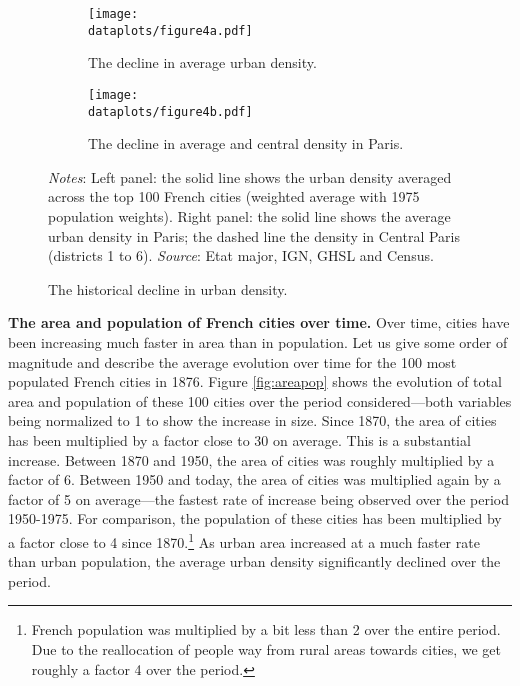 \documentclass[./20250130-paper.tex]{subfiles}
\begin{document}
\begin{figure}[p]
	\begin{subfigure}{0.5\textwidth}
		\texttt{[image: \\dataplots/figure4a.pdf]}
		\caption{The decline in average urban density.\label{fig:avdensity}
		}
	\end{subfigure}%
	\hspace{5mm}
	\begin{subfigure}{0.5\textwidth}
		\texttt{[image: \\dataplots/figure4b.pdf]}
		\caption{The decline in average and central density in Paris.\label{fig:avdensity-paris}}
	\end{subfigure}
	\caption{The historical decline in urban density.}
	{\footnotesize \textit{Notes}: Left panel: the solid line shows the urban density averaged across the top 100 French cities (weighted average with 1975 population weights). Right panel: the solid line shows the average urban density in Paris; the dashed line the density in Central Paris (districts 1 to 6).
		\textit{Source}: Etat major, IGN, GHSL and Census.}
\end{figure}


\textbf{The area and population of French cities over time.} Over time, cities have been increasing much faster in area than in population. Let us give some order of magnitude and describe the average evolution over time for the 100 most populated French cities in 1876. Figure \ref{fig:areapop} shows the evolution of total area and population of these 100 cities over the period considered---both variables being normalized to 1 to show the increase in size. Since 1870, the area of cities has been multiplied by a factor close to 30 on average. This is a substantial increase. Between 1870 and 1950,  the area of cities was roughly multiplied by a factor of 6. Between 1950 and today, the area of cities was multiplied again by a factor of 5 on average---the fastest rate of increase being observed over the period 1950-1975. For comparison, the population of these cities has been multiplied by a factor close to 4 since 1870.\footnote{French population was multiplied by a bit less than 2 over the entire period. Due to the reallocation of people way from rural areas towards cities, we get roughly a factor 4 over the period.} As urban area increased at a much faster rate than urban population, the average urban density significantly declined over the period.
\end{document}
